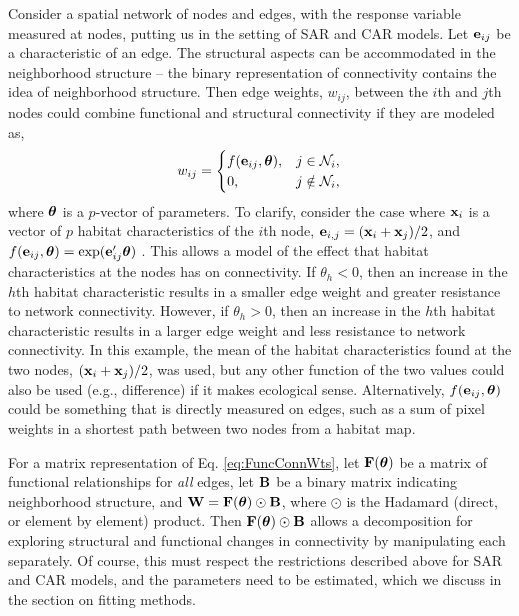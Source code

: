 \documentclass[11pt, titlepage]{article}\usepackage[]{graphicx}\usepackage[]{color}
\begin{document}
\begin{spacing}{1.9}
\begin{flushleft}
Consider a spatial network of nodes and edges, with the response variable measured at nodes, putting us in the setting of SAR and CAR models.  Let $\mathbf{e}_{ij}$ be a characteristic of an edge. The structural aspects can be accommodated in the neighborhood structure -- the binary representation of connectivity contains the idea of neighborhood structure. Then edge weights, $w_{ij}$, between the $i$th and $j$th nodes could combine functional and structural connectivity if they are modeled as,
\begin{equation} \label{eq:FuncConnWts}
   w_{ij}= \begin{cases}
     f(\mathbf{e}_{ij}, \mbox{\boldmath $\theta$}), & j \in \mathcal{N}_i, \\
            0, & j \notin \mathcal{N}_i, \\
    \end{cases}
\end{equation}
where $\mbox{\boldmath $\theta$}$ is a $p$-vector of parameters.  To clarify, consider the case where $\mathbf{x}_i$ is a vector of $p$ habitat characteristics of the $i$th node, $\mathbf{e}_{i,j} = (\mathbf{x}_i +\mathbf{x}_j)/2$, and $f(\mathbf{e}_{ij},\mbox{\boldmath $\theta$}) = \exp(\mathbf{e}^{\prime}_{ij}\mbox{\boldmath $\theta$})$ \citep{Hank:Hoot:circ:2013}. This allows a model of the effect that habitat characteristics at the nodes has on connectivity. If $\theta_h < 0$, then an increase in the $h$th habitat characteristic results in a smaller edge weight and greater resistance to network connectivity. However, if $\theta_h > 0$, then an increase in the $h$th habitat characteristic results in a larger edge weight and less resistance to network connectivity. In this example, the mean of the habitat characteristics found at the two nodes, $(\mathbf{x}_i +\mathbf{x}_j)/2$, was used, but any other function of the two values could also be used (e.g., difference) if it makes ecological sense.  Alternatively, $f(\mathbf{e}_{ij},\mbox{\boldmath $\theta$})$ could be something that is directly measured on edges, such as a sum of pixel weights in a shortest path between two nodes from a habitat map.   

For a matrix representation of Eq. \ref{eq:FuncConnWts}, let $\mathbf{F}(\mbox{\boldmath $\theta$})$ be a matrix of functional relationships for \textit{all} edges, let $\mathbf{B}$ be a binary matrix indicating neighborhood structure, and $\mathbf{W} = \mathbf{F}(\mbox{\boldmath $\theta$}) \odot \mathbf{B}$, where $\odot$ is the Hadamard (direct, or element by element) product. Then $\mathbf{F}(\mbox{\boldmath $\theta$}) \odot \mathbf{B}$ allows a decomposition for exploring structural and functional changes in connectivity by manipulating each separately. Of course, this must respect the restrictions described above for SAR and CAR models, and the parameters need to be estimated, which we discuss in the section on fitting methods.


\end{flushleft}
\end{spacing}
\end{document}
